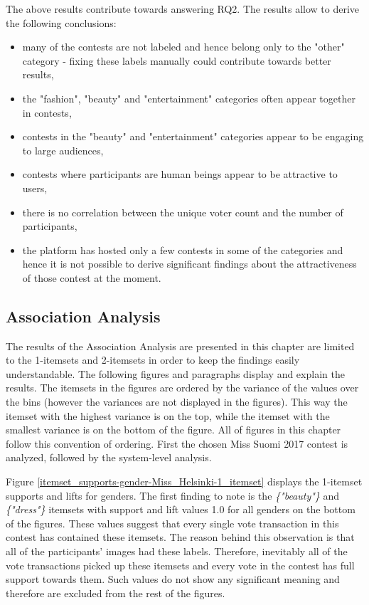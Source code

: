     The above results contribute towards answering RQ2. The results allow to derive the following conclusions: 

    \begin{itemize}
        \item many of the contests are not labeled and hence belong only to the "other" category - fixing these labels manually could contribute towards better results,
        \item the "fashion", "beauty" and "entertainment" categories often appear together in contests,
        \item contests in the "beauty" and "entertainment" categories appear to be engaging to large audiences,
        \item contests where participants are human beings appear to be attractive to users,
        \item there is no correlation between the unique voter count and the number of participants,
        \item the platform has hosted only a few contests in some of the categories and hence it is not possible to derive significant findings about the attractiveness of those contest at the moment.
    \end{itemize}

\subsection{Association Analysis}
The results of the Association Analysis are presented in this chapter are limited to the 1-itemsets and 2-itemsets in order to keep the findings easily understandable. The following figures and paragraphs display and explain the results. The itemsets in the figures are ordered by the variance of the values over the bins (however the variances are not displayed in the figures). This way the itemset with the highest variance is on the top, while the itemset with the smallest variance is on the bottom of the figure. All of figures in this chapter follow this convention of ordering. First the chosen Miss Suomi 2017 contest is analyzed, followed by the system-level analysis.

Figure \ref{itemset_supports-gender-Miss_Helsinki-1_itemset} displays the 1-itemset supports and lifts for genders. The first finding to note is the \emph{\{"beauty"\}} and \emph{\{"dress"\}} itemsets with support and lift values 1.0 for all genders on the bottom of the figures. These values suggest that every single vote transaction in this contest has contained these itemsets. The reason behind this observation is that all of the participants' images had these labels. Therefore, inevitably all of the vote transactions picked up these itemsets and every vote in the contest has full support towards them. Such values do not show any significant meaning and therefore are excluded from the rest of the figures.

